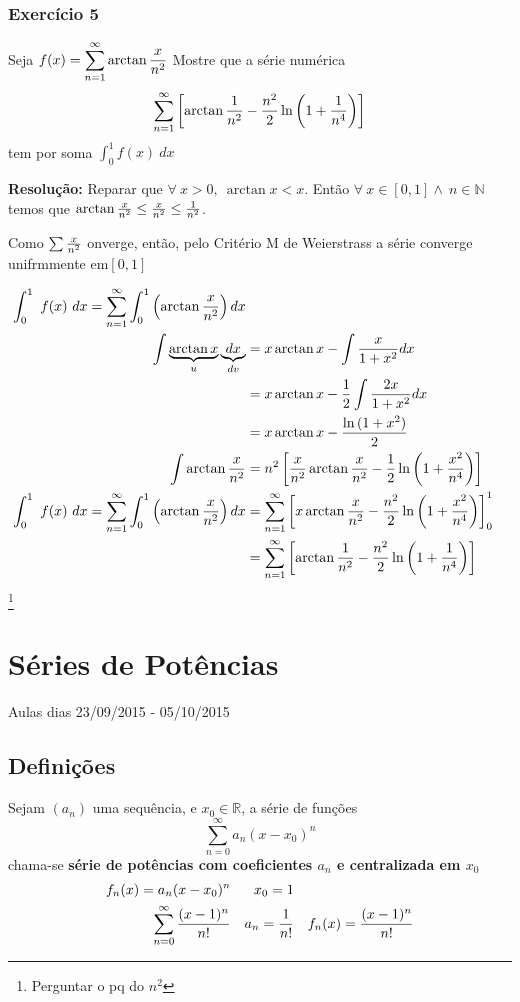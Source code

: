 \documentclass[12pt,openany, letterpaper]{book}
\newcommand{\soma}[2][n]{\sum_{{#1} = #2}^\infty}
\newcommand{\E}[1]{Exercício #1}
\newcommand{\cmw}{Critério M de Weierstrass }
\begin{document}
{\subsection*{\E{5}}{Seja $\displaystyle{f(x) = \soma{1} \arctan {x \over n^2}}$ Mostre que a série numérica $$\soma{1} \left[ \arctan{1 \over n^2} - \frac{n^2}{2} \ln \left(1+\frac{1}{n^4}\right) \right]$$ tem por soma $\displaystyle{\int_0^1 f(x) \ dx}$ 

\textbf{Resolução:} Reparar que $\forall \ x > 0, \ \arctan{x} < x$. Então $\forall \ x \in [0,1] \land \ n \in \mathds{N}$ temos que $\arctan{x \over n^2} \leq {x \over n^2} \leq {1 \over n^2}$.\vspace{2mm}


Como $\sum{x \over n^2}$ onverge, então, pelo \cmw a série converge unifrmmente em$[0,1]$

\begin{align*}
\int_0^1 \ f(x) \ dx = \soma{1} \int_0^1 \left( \arctan{x \over n^2}\right)dx \\
\int \underbrace{\arctan{x}}_{u}\underbrace{dx}_{dv} &= x\arctan{x} - \int {x \over 1+x^2}dx \\
&= x \arctan{x} - \frac{1}{2}\int {2x \over 1+x^2}dx\\
&= x \arctan{x} - \frac{\ln{(1+x^2)}}{2}\\
\int \arctan{x \over n^2} &= n^2 \left[ {x \over n^2}\arctan{x \over n^2} - \frac{1}{2}\ln{\left(1 + {x^2 \over n^4}\right)}\right]\\
\int_0^1 \ f(x) \ dx = \soma{1} \int_0^1 \left( \arctan{x \over n^2}\right)dx &= \soma{1} \left[x \arctan{x \over n^2} - \frac{n^2}{2}\ln{\left(1 + {x^2 \over n^4}\right)} \right]_0^1 \\
&= \soma{1} \left[\arctan{1 \over n^2} - \frac{n^2}{2}\ln{\left(1 + {1 \over n^4}\right)} \right]
\end{align*}
\footnote{Perguntar o pq do $n^2$}

\chapter{Séries de Potências}{Aulas dias 23/09/2015 - 05/10/2015}
\label{chap:c5}

\section{Definições}
Sejam $(a_n)$ uma sequência, e $x_0 \in \mathds{R}$, a série de funções $$\soma{0} a_n (x-x_0)^n$$ chama-se \textbf{série de potências com coeficientes $a_n$ e centralizada em $x_0$} 
\begin{align*}
f_n(x) = a_n (x-x_0)^n & & x_0 =1\\
\soma{0} {(x-1)^n \over n!} & & a_n = \frac{1}{n!} &  & f_n(x) = {(x-1)^n \over n!}
\end{align*}

}}
\end{document}

